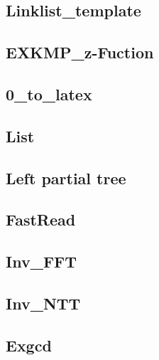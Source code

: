 \subsection{Linklist\_template}
\raggedbottom
\hrulefill

\subsection{EXKMP\_z-Fuction}
\raggedbottom
\hrulefill

\subsection{0\_to\_latex}
\raggedbottom
\hrulefill

\subsection{List}
\raggedbottom
\hrulefill

\subsection{Left partial tree}
\raggedbottom
\hrulefill

\subsection{FastRead}
\raggedbottom
\hrulefill

\subsection{Inv\_FFT}
\raggedbottom
\hrulefill

\subsection{Inv\_NTT}
\raggedbottom
\hrulefill

\subsection{Exgcd}
\raggedbottom
\hrulefill

